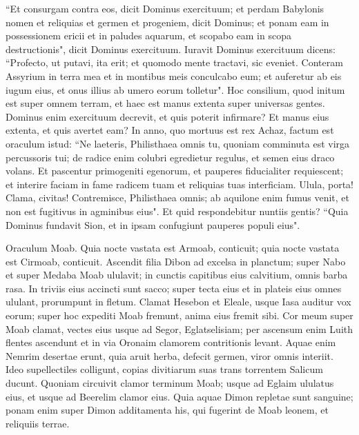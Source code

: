 \begin{biblechapter}
\verse “Et consurgam contra eos, dicit Dominus exercituum; et perdam Babylonis nomen et reliquias et germen et progeniem, dicit Dominus; 
\verse et ponam eam in possessionem ericii et in paludes aquarum, et scopabo eam in scopa destructionis", dicit Dominus exercituum. 
\verse Iuravit Dominus exercituum dicens: “Profecto, ut putavi, ita erit; et quomodo mente tractavi, sic eveniet. 
\verse Conteram Assyrium in terra mea et in montibus meis conculcabo eum; et auferetur ab eis iugum eius, et onus illius ab umero eorum tolletur". 
\verse Hoc consilium, quod initum est super omnem terram, et haec est manus extenta super universas gentes. 
\verse Dominus enim exercituum decrevit, et quis poterit infirmare? Et manus eius extenta, et quis avertet eam? 
\verse In anno, quo mortuus est rex Achaz, factum est oraculum istud: 
\verse “Ne laeteris, Philisthaea omnis tu, quoniam comminuta est virga percussoris tui; de radice enim colubri egredietur regulus, et semen eius draco volans. 
\verse Et pascentur primogeniti egenorum, et pauperes fiducialiter requiescent; et interire faciam in fame radicem tuam et reliquias tuas interficiam. 
\verse Ulula, porta! Clama, civitas! Contremisce, Philisthaea omnis; ab aquilone enim fumus venit, et non est fugitivus in agminibus eius". 
\verse Et quid respondebitur nuntiis gentis? “Quia Dominus fundavit Sion, et in ipsam confugiunt pauperes populi eius". 
\end{biblechapter}

\begin{biblechapter}  
\verse Oraculum Moab. Quia nocte vastata est Armoab, conticuit; quia nocte vastata est Cirmoab, conticuit. 
\verse Ascendit filia Dibon ad excelsa in planctum; super Nabo et super Medaba Moab ululavit; in cunctis capitibus eius calvitium, omnis barba rasa. 
\verse In triviis eius accincti sunt sacco; super tecta eius et in plateis eius omnes ululant, prorumpunt in fletum. 
\verse Clamat Hesebon et Eleale, usque Iasa auditur vox eorum; super hoc expediti Moab fremunt, anima eius fremit sibi. 
\verse Cor meum super Moab clamat, vectes eius usque ad Segor, Eglatselisiam; per ascensum enim Luith flentes ascendunt et in via Oronaim clamorem contritionis levant. 
\verse Aquae enim Nemrim desertae erunt, quia aruit herba, defecit germen, viror omnis interiit. 
\verse Ideo supellectiles colligunt, copias divitiarum suas trans torrentem Salicum ducunt. 
\verse Quoniam circuivit clamor terminum Moab; usque ad Eglaim ululatus eius, et usque ad Beerelim clamor eius. 
\verse Quia aquae Dimon repletae sunt sanguine; ponam enim super Dimon additamenta his, qui fugerint de Moab leonem, et reliquiis terrae. 
\end{biblechapter}

